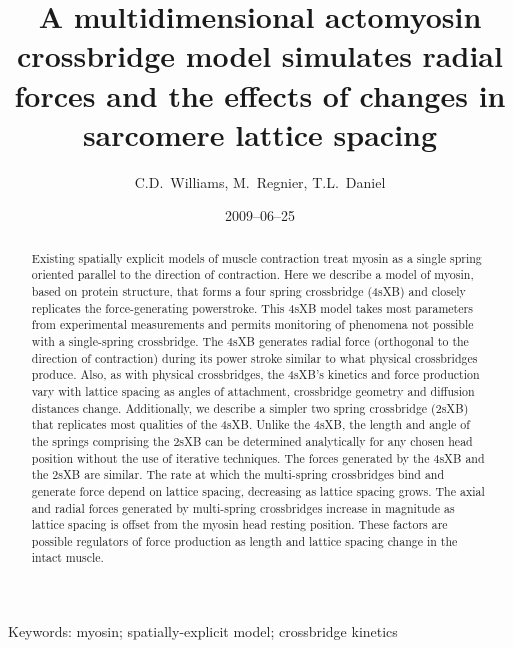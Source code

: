 \documentclass[]{article}
\title{A multidimensional actomyosin crossbridge model simulates radial forces and the effects of changes in sarcomere lattice spacing}
\author{C.D.\ Williams, M.\ Regnier, T.L.\ Daniel}
\date{2009--06--25}
\begin{document}
\maketitle{}

\begin{abstract} 
Existing spatially explicit models of muscle contraction treat myosin as a single spring oriented parallel to the direction of contraction.
Here we describe a model of myosin, based on protein structure, that forms a four spring crossbridge (4sXB) and closely replicates the force-generating powerstroke.
This 4sXB model takes most parameters from experimental measurements and permits monitoring of phenomena not possible with a single-spring crossbridge.
The 4sXB generates radial force (orthogonal to the direction of contraction) during its power stroke similar to what physical crossbridges produce.
Also, as with physical crossbridges, the 4sXB's kinetics and force production vary with lattice spacing as angles of attachment, crossbridge geometry and diffusion distances change.
Additionally, we describe a simpler two spring crossbridge (2sXB) that replicates most qualities of the 4sXB.
Unlike the 4sXB, the length and angle of the springs comprising the 2sXB can be determined analytically for any chosen head position without the use of iterative techniques.
The forces generated by the 4sXB and the 2sXB are similar.
The rate at which the multi-spring crossbridges bind and generate force depend on lattice spacing, decreasing as lattice spacing grows. 
The axial and radial forces generated by multi-spring crossbridges increase in magnitude as lattice spacing is offset from the myosin head resting position. 
These factors are possible regulators of force production as length and lattice spacing change in the intact muscle.
\end{abstract}

Keywords: myosin; spatially-explicit model; crossbridge kinetics

\end{document}

